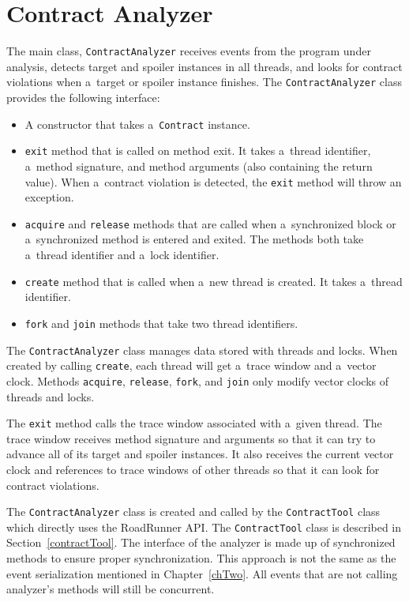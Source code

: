 \section{Contract Analyzer}
\label{contractAnalyzer}
The main class, \texttt{ContractAnalyzer} receives events from the program under
analysis, detects target and spoiler instances in all threads, and looks for
contract violations when a~target or spoiler instance finishes. The
\texttt{ContractAnalyzer} class provides the following interface:
\begin{itemize}
    \item A constructor that takes a~\texttt{Contract} instance.
    \item \texttt{exit} method that is called on method exit. It takes a~thread
        identifier, a~method signature, and method arguments (also containing
        the return value). When a~contract violation is detected, the
        \texttt{exit} method will throw an exception.
    \item \texttt{acquire} and \texttt{release} methods that are called when
        a~synchronized block or a~synchronized method is entered and exited. The
        methods both take a~thread identifier and a~lock identifier.
    \item \texttt{create} method that is called when a~new thread is created. It
        takes a~thread identifier.
    \item \texttt{fork} and \texttt{join} methods that take two thread
        identifiers.
\end{itemize}

The \texttt{ContractAnalyzer} class manages data stored with threads and locks.
When created by calling \texttt{create}, each thread will get a~trace window and
a~vector clock. Methods \texttt{acquire}, \texttt{release}, \texttt{fork}, and
\texttt{join} only modify vector clocks of threads and locks.

The \texttt{exit} method calls the trace window associated with a~given thread.
The trace window receives method signature and arguments so that it can try to
advance all of its target and spoiler instances. It also receives the current
vector clock and references to trace windows of other threads so that it can
look for contract violations.

The \texttt{ContractAnalyzer} class is created and called by the
\texttt{ContractTool} class which directly uses the RoadRunner API. The
\texttt{ContractTool} class is described in Section~\ref{contractTool}. The
interface of the analyzer is made up of synchronized methods to ensure proper
synchronization. This approach is not the same as the event serialization
mentioned in Chapter~\ref{chTwo}. All events that are not calling analyzer's
methods will still be concurrent.

